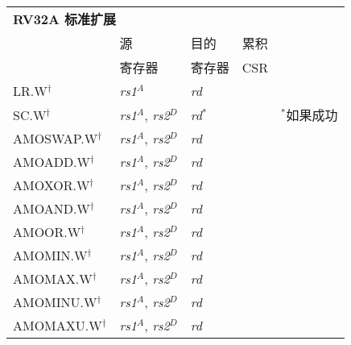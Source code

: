 \begin{tabular}{p{3cm}|p{3cm}|p{2cm}|p{4cm}|p{4cm}}
  \multicolumn{4}{l}{\bf RV32A 标准扩展} \\
  \cline{2-4}
    & 源    & 目的 & 累积 \\
    & 寄存器 & 寄存器   & CSR \\
  \cline{2-4}
   LR.W$^\dagger$ & {\em rs1}$^A$ & {\em rd} &   & \\
   \cline{2-4}
   SC.W$^\dagger$ & {\em rs1}$^A$, {\em rs2}$^D$ & {\em rd}$^*$ & & $^*$如果成功  \\
   \cline{2-4}
   AMOSWAP.W$^\dagger$ & {\em rs1}$^A$, {\em rs2}$^D$ & {\em rd} &   & \\
   \cline{2-4}
   AMOADD.W$^\dagger$ & {\em rs1}$^A$, {\em rs2}$^D$ & {\em rd} &   & \\
   \cline{2-4}
   AMOXOR.W$^\dagger$ & {\em rs1}$^A$, {\em rs2}$^D$ & {\em rd} &   & \\
   \cline{2-4}
   AMOAND.W$^\dagger$ & {\em rs1}$^A$, {\em rs2}$^D$ & {\em rd} &   & \\
   \cline{2-4}
   AMOOR.W$^\dagger$ & {\em rs1}$^A$, {\em rs2}$^D$ & {\em rd} &   & \\
   \cline{2-4}
   AMOMIN.W$^\dagger$ & {\em rs1}$^A$, {\em rs2}$^D$ & {\em rd} &   & \\
   \cline{2-4}
   AMOMAX.W$^\dagger$ & {\em rs1}$^A$, {\em rs2}$^D$ & {\em rd} &   & \\
   \cline{2-4}
   AMOMINU.W$^\dagger$ & {\em rs1}$^A$, {\em rs2}$^D$ & {\em rd} &   & \\
   \cline{2-4}
   AMOMAXU.W$^\dagger$ & {\em rs1}$^A$, {\em rs2}$^D$ & {\em rd} &   & \\
   \cline{2-4}
\end{tabular}

